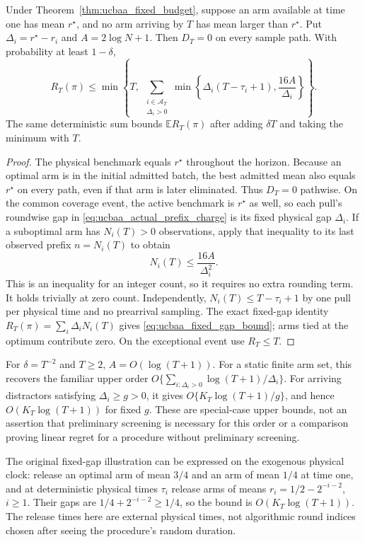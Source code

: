 \begin{corollary}
\label{cor:ucbaa_fixed_gap}
Under Theorem~\ref{thm:ucbaa_fixed_budget}, suppose an arm available at
time one has mean $r^\star$, and no arm arriving by $T$ has mean larger
than $r^\star$. Put $\Delta_i=r^\star-r_i$ and $A=2\log N+1$.
Then $D_T=0$ on every sample path. With probability at least $1-\delta$,
\begin{equation}
 R_T(\pi)\le
 \min\left\{T,\ \sum_{\substack{i\in\mathcal A_T\\\Delta_i>0}}
   \min\left\{\Delta_i(T-\tau_i+1),\frac{16A}{\Delta_i}\right\}
     \right\}.
 \label{eq:ucbaa_fixed_gap_bound}
\end{equation}
The same deterministic sum bounds $\mathbb E R_T(\pi)$ after adding
$\delta T$ and taking the minimum with $T$.
\end{corollary}
\begin{proof}
The physical benchmark equals $r^\star$ throughout the horizon. Because
an optimal arm is in the initial admitted batch, the best admitted mean
also equals $r^\star$ on every path, even if that arm is later eliminated.
Thus $D_T=0$ pathwise. On the common coverage event, the active benchmark
is $r^\star$ as well, so each pull's roundwise gap in
\eqref{eq:ucbaa_actual_prefix_charge} is its fixed physical gap $\Delta_i$.
If a suboptimal arm has $N_i(T)>0$ observations, apply that inequality to
its last observed prefix $n=N_i(T)$ to obtain
\[
 N_i(T)\le\frac{16A}{\Delta_i^2}.
\]
This is an inequality for an integer count, so it requires no extra
rounding term. It holds trivially at zero count. Independently,
$N_i(T)\le T-\tau_i+1$ by one pull per physical time and no prearrival
sampling. The exact fixed-gap identity
$R_T(\pi)=\sum_i\Delta_iN_i(T)$ gives
\eqref{eq:ucbaa_fixed_gap_bound}; arms tied at the optimum contribute
zero. On the exceptional event use $R_T\le T$.
\end{proof}

For $\delta=T^{-2}$ and $T\ge2$, $A=O(\log(T+1))$.
For a static finite arm set, this recovers the familiar upper order
$O\{\sum_{i:\Delta_i>0}\log(T+1)/\Delta_i\}$.
For arriving distractors satisfying $\Delta_i\ge g>0$, it gives
$O\{K_T\log(T+1)/g\}$, and hence $O(K_T\log(T+1))$ for fixed $g$.
These are special-case upper bounds, not an assertion that preliminary
screening is necessary for this order or a comparison proving linear
regret for a procedure without preliminary screening.

The original fixed-gap illustration can be expressed on the exogenous
physical clock: release an optimal arm of mean $3/4$ and an arm of mean
$1/4$ at time one, and at deterministic physical times $\tau_i$ release
arms of means $r_i=1/2-2^{-i-2}$, $i\ge1$. Their gaps are
$1/4+2^{-i-2}\ge1/4$, so the bound is $O(K_T\log(T+1))$.
The release times here are external physical times, not algorithmic round
indices chosen after seeing the procedure's random duration.

